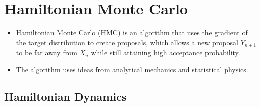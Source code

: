 \documentclass[10pt]{article}
\begin{document}
\section{Hamiltonian Monte Carlo}

\begin{itemize}
  \item Hamiltonian Monte Carlo (HMC) is an algorithm that uses the gradient of the target distribution to create proposals, which allows a new proposal $Y_{n+1}$ to be far away from $X_n$ while still attaining high acceptance probability.
  
  \item The algorithm uses ideas from analytical mechanics and statistical physics.
\end{itemize}

\subsection{Hamiltonian Dynamics}
\end{document}
